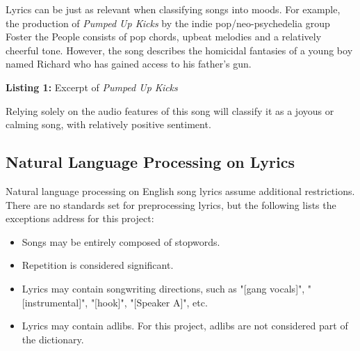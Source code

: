 \documentclass[11pt]{article}
\begin{document}
Lyrics can be just as relevant when classifying songs into moods. For example, the production of \textit{Pumped Up Kicks} by the indie pop/neo-psychedelia group Foster the People consists of pop chords, upbeat melodies and a relatively cheerful tone. However, the song describes the homicidal fantasies of a young boy named Richard who has gained access to his father's gun.

\begin{table}[!ht]
  \begin{center}
    \footnotesize
  \end{center}
  \caption*{\textbf{Listing 1:} Excerpt of \textit{Pumped Up Kicks}}
\end{table}

Relying solely on the audio features of this song will classify it as a joyous or calming song, with relatively positive sentiment.

\subsection{Natural Language Processing on Lyrics}

Natural language processing on English song lyrics assume additional restrictions. There are no standards set for preprocessing lyrics, but the following lists the exceptions address for this project:
\begin{itemize}
  \item Songs may be entirely composed of stopwords.
  \item Repetition is considered significant.
  \item Lyrics may contain songwriting directions, such as "[gang vocals]", "[instrumental]", "[hook]", "[Speaker A]", etc.
  \item Lyrics may contain adlibs. For this project, adlibs are not considered part of the dictionary.
\end{itemize}
\end{document}
